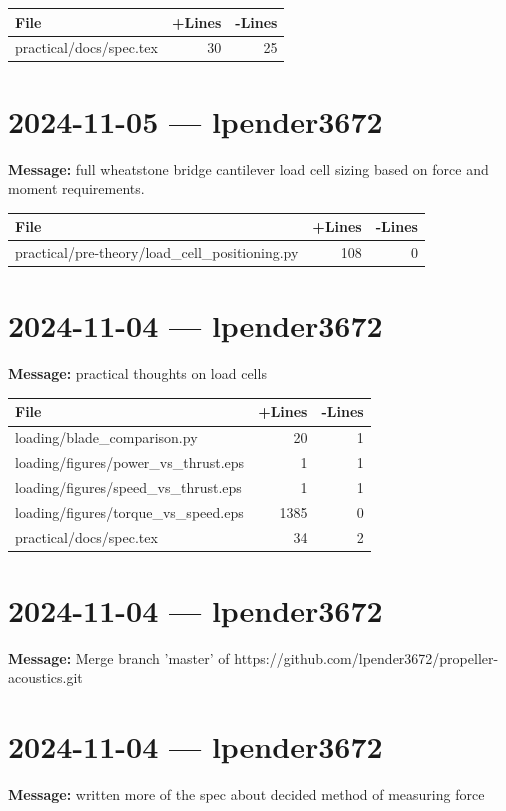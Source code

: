 \documentclass{article}
\begin{document}
\begin{longtable}{|p{10cm}|r|r|}
\hline \textbf{File} & \textbf{+Lines} & \textbf{-Lines} \\
\hline
practical/docs/spec.tex & 30 & 25 \\
\hline
\end{longtable}

\section*{2024-11-05 --- lpender3672}
\textbf{Message:} full wheatstone bridge cantilever load cell sizing based on force and moment requirements.

\begin{longtable}{|p{10cm}|r|r|}
\hline \textbf{File} & \textbf{+Lines} & \textbf{-Lines} \\
\hline
practical/pre-theory/load\_cell\_positioning.py & 108 & 0 \\
\hline
\end{longtable}

\section*{2024-11-04 --- lpender3672}
\textbf{Message:} practical thoughts on load cells

\begin{longtable}{|p{10cm}|r|r|}
\hline \textbf{File} & \textbf{+Lines} & \textbf{-Lines} \\
\hline
loading/blade\_comparison.py & 20 & 1 \\
\hline
loading/figures/power\_vs\_thrust.eps & 1 & 1 \\
\hline
loading/figures/speed\_vs\_thrust.eps & 1 & 1 \\
\hline
loading/figures/torque\_vs\_speed.eps & 1385 & 0 \\
\hline
practical/docs/spec.tex & 34 & 2 \\
\hline
\end{longtable}

\section*{2024-11-04 --- lpender3672}
\textbf{Message:} Merge branch 'master' of https://github.com/lpender3672/propeller-acoustics.git

\section*{2024-11-04 --- lpender3672}
\textbf{Message:} written more of the spec about decided method of measuring force
\end{document}
